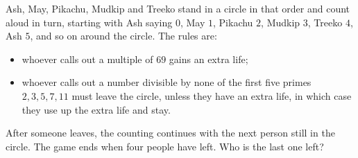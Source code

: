 Ash, May, Pikachu, Mudkip and Treeko stand in a circle in that order and count aloud in turn, starting with Ash saying $0$, May $1$, Pikachu $2$, Mudkip $3$, Treeko $4$, Ash $5$, and so on around the circle. The rules are:
\begin{itemize}
\item whoever calls out a multiple of $69$ gains an extra life;
\item whoever calls out a number divisible by none of the first five primes $2,3,5,7,11$ must leave the circle, unless they have an extra life, in which case they use up the extra life and stay.
\end{itemize}
After someone leaves, the counting continues with the next person still in the circle. The game ends when four people have left. Who is the last one left?
